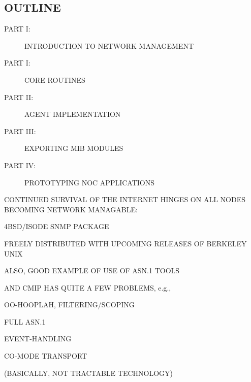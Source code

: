 

\begin{bwslide}
\part*	{OUTLINE}\bf

\begin{description}
\item[PART I:]		INTRODUCTION TO NETWORK MANAGEMENT

\item[PART I:]		CORE ROUTINES

\item[PART II:]		AGENT IMPLEMENTATION

\item[PART III:]	EXPORTING MIB MODULES

\item[PART IV:]		PROTOTYPING NOC APPLICATIONS
\end{description}
\end{bwslide}


\begin{bwslide}

\begin{nrtc}
\item	CONTINUED SURVIVAL OF THE INTERNET HINGES ON ALL NODES
	BECOMING NETWORK MANAGABLE:
    \begin{nrtc}
    \item	4BSD/ISODE SNMP PACKAGE

    \item	FREELY DISTRIBUTED WITH UPCOMING RELEASES OF BERKELEY UNIX
    \end{nrtc}

\item	ALSO, GOOD EXAMPLE OF USE OF ASN.1 TOOLS

\item	AND CMIP HAS QUITE A FEW PROBLEMS, e.g.,
    \begin{nrtc}
    \item	OO-HOOPLAH, FILTERING/SCOPING

    \item	FULL ASN.1

    \item	EVENT-HANDLING

    \item	CO-MODE TRANSPORT
    \end{nrtc}
    (BASICALLY, NOT TRACTABLE TECHNOLOGY)
\end{nrtc}
\end{bwslide}


